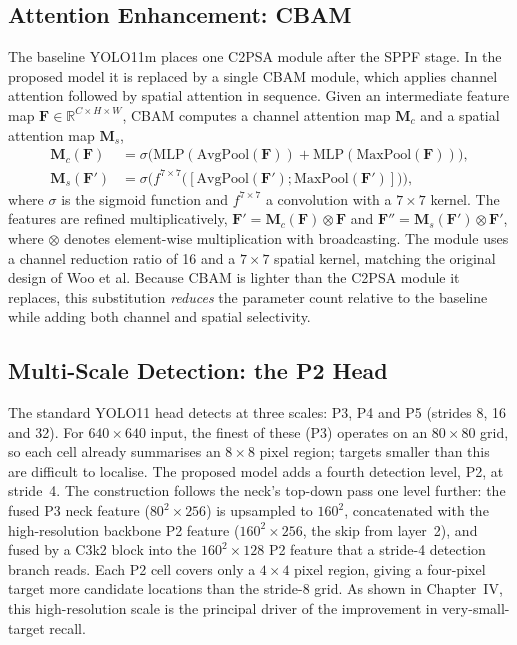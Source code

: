\subsection{Attention Enhancement: CBAM}
\label{sec:cbam3}
The baseline YOLO11m places one C2PSA module after the SPPF stage. In the
proposed model it is replaced by a single CBAM module, which applies
channel attention followed by spatial attention in sequence. Given an
intermediate feature map $\mathbf{F} \in \mathbb{R}^{C \times H \times W}$, CBAM
computes a channel attention map $\mathbf{M}_c$ and a spatial attention map
$\mathbf{M}_s$,
\begin{align}
  \mathbf{M}_c(\mathbf{F}) &= \sigma\!\big(\mathrm{MLP}(\mathrm{AvgPool}(\mathbf{F}))
      + \mathrm{MLP}(\mathrm{MaxPool}(\mathbf{F}))\big), \\
  \mathbf{M}_s(\mathbf{F}') &= \sigma\!\big(f^{7\times7}\big([\mathrm{AvgPool}(\mathbf{F}');
      \mathrm{MaxPool}(\mathbf{F}')]\big)\big),
\end{align}
where $\sigma$ is the sigmoid function and $f^{7\times7}$ a convolution with a
$7\times7$ kernel. The features are refined multiplicatively,
$\mathbf{F}' = \mathbf{M}_c(\mathbf{F}) \otimes \mathbf{F}$ and
$\mathbf{F}'' = \mathbf{M}_s(\mathbf{F}') \otimes \mathbf{F}'$, where $\otimes$
denotes element-wise multiplication with broadcasting. The module uses a channel
reduction ratio of 16 and a $7\times7$ spatial kernel, matching the original
design of Woo et al. Because CBAM is lighter than the C2PSA module it
replaces, this substitution \emph{reduces} the parameter count relative
to the baseline while adding both channel and spatial selectivity.

\subsection{Multi-Scale Detection: the P2 Head}
The standard YOLO11 head detects at three scales: P3, P4 and P5 (strides 8, 16
and 32). For $640 \times 640$ input, the finest of these (P3) operates on an
$80 \times 80$ grid, so each cell already summarises an $8 \times 8$ pixel
region; targets smaller than this are difficult to localise. The proposed model
adds a fourth detection level, P2, at stride~4. The construction follows the
neck's top-down pass one level further: the fused P3 neck feature
($80^2 \times 256$) is upsampled to $160^2$, concatenated with the
high-resolution backbone P2 feature ($160^2 \times 256$, the skip from
layer~2), and fused by a C3k2 block into the $160^2 \times 128$ P2 feature that
a stride-4 detection branch reads. Each P2 cell covers only a $4 \times 4$ pixel
region, giving a four-pixel target more candidate locations than the stride-8
grid. As shown in Chapter~IV, this high-resolution scale is the principal
driver of the improvement in very-small-target recall.

